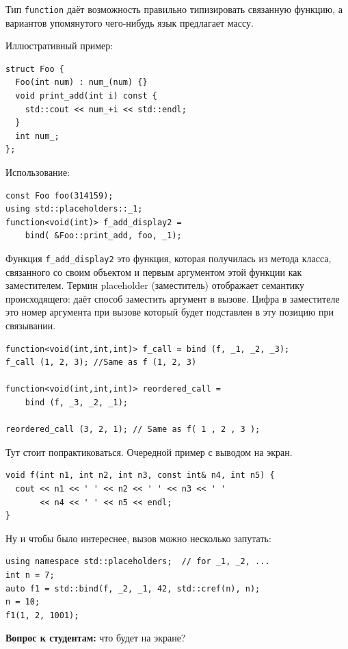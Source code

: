 \documentclass[a4paper,12pt,oneside]{article}
\begin{document}
Тип \lstinline!function! даёт возможность правильно типизировать связанную функцию, а вариантов упомянутого чего-нибудь язык предлагает массу.

Иллюстративный пример:

\begin{lstlisting}
struct Foo {
  Foo(int num) : num_(num) {}
  void print_add(int i) const { 
    std::cout << num_+i << std::endl; 
  }
  int num_;
};
\end{lstlisting}

Использование:

\begin{lstlisting}
const Foo foo(314159);
using std::placeholders::_1;
function<void(int)> f_add_display2 = 
    bind( &Foo::print_add, foo, _1);
\end{lstlisting}

Функция \lstinline!f_add_display2! это функция, которая получилась из метода класса, связанного со своим объектом и первым аргументом этой функции как заместителем. Термин placeholder (заместитель) отображает семантику происходящего: даёт способ заместить аргумент в вызове. Цифра в заместителе это номер аргумента при вызове который будет подставлен в эту позицию при связывании.

\begin{lstlisting}
function<void(int,int,int)> f_call = bind (f, _1, _2, _3);
f_call (1, 2, 3); //Same as f (1, 2, 3)

function<void(int,int,int)> reordered_call = 
    bind (f, _3, _2, _1);

reordered_call (3, 2, 1); // Same as f( 1 , 2 , 3 );
\end{lstlisting}

Тут стоит попрактиковаться. Очередной пример с выводом на экран.

\begin{lstlisting}
void f(int n1, int n2, int n3, const int& n4, int n5) {
  cout << n1 << ' ' << n2 << ' ' << n3 << ' ' 
       << n4 << ' ' << n5 << endl;
}
\end{lstlisting}

Ну и чтобы было интереснее, вызов можно несколько запутать:

\begin{lstlisting}
using namespace std::placeholders;  // for _1, _2, ...
int n = 7;
auto f1 = std::bind(f, _2, _1, 42, std::cref(n), n);
n = 10;
f1(1, 2, 1001); 
\end{lstlisting}

\textbf{Вопрос к студентам:} что будет на экране?
\end{document}
